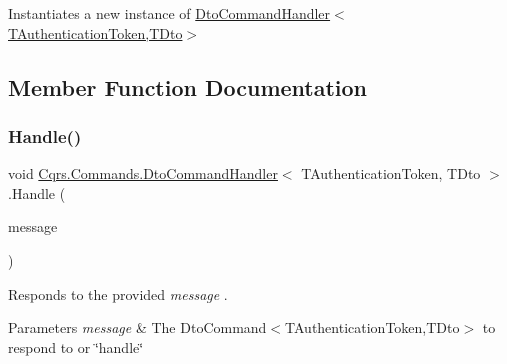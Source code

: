 Instantiates a new instance of \hyperlink{classCqrs_1_1Commands_1_1DtoCommandHandler_aaff94627552cf26c503c628eb49adb60_aaff94627552cf26c503c628eb49adb60}{Dto\+Command\+Handler$<$\+T\+Authentication\+Token,\+T\+Dto$>$} 



\subsection{Member Function Documentation}
\mbox{\label{classCqrs_1_1Commands_1_1DtoCommandHandler_a344c5d909b31fe7ad6b81c69ab569fc8_a344c5d909b31fe7ad6b81c69ab569fc8}} 
\subsubsection{\texorpdfstring{Handle()}{Handle()}}
{\footnotesize\ttfamily void \hyperlink{classCqrs_1_1Commands_1_1DtoCommandHandler}{Cqrs.\+Commands.\+Dto\+Command\+Handler}$<$ T\+Authentication\+Token, T\+Dto $>$.Handle (\begin{DoxyParamCaption}\item[{\hyperlink{classCqrs_1_1Commands_1_1DtoCommand}{Dto\+Command}$<$ T\+Authentication\+Token, T\+Dto $>$}]{message }\end{DoxyParamCaption})}



Responds to the provided {\itshape message} . 


\begin{DoxyParams}{Parameters}
{\em message} & The Dto\+Command$<$\+T\+Authentication\+Token,\+T\+Dto$>$ to respond to or \char`\"{}handle\char`\"{}\\
\hline
\end{DoxyParams}
